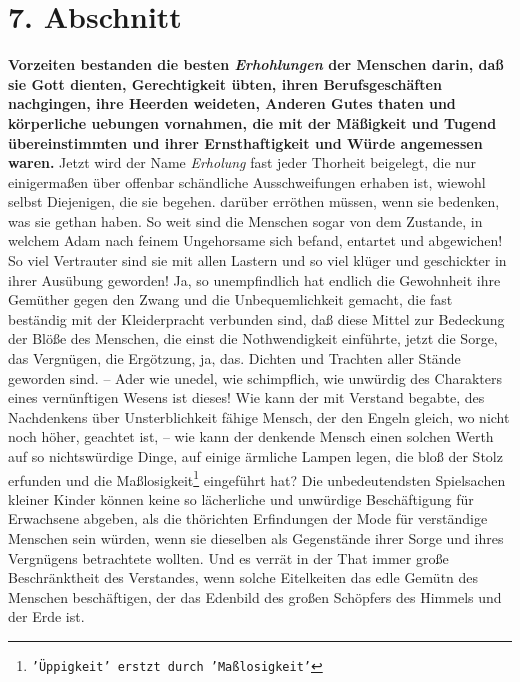 \section{7. Abschnitt} \label{kap14_ab7}

\label{ref:14_07_wahre_nachfolger_erholung}
 \textbf{Vorzeiten bestanden die besten \textit{Erhohlungen} der Menschen darin, daß sie Gott
dienten, Gerechtigkeit übten, ihren Berufsgeschäften nachgingen, ihre Heerden
weideten, Anderen Gutes thaten und körperliche uebungen vornahmen, die mit der
Mäßigkeit und Tugend übereinstimmten und ihrer Ernsthaftigkeit und Würde
angemessen waren.} Jetzt wird der Name \textit{Erholung} fast jeder Thorheit
beigelegt, die nur einigermaßen über offenbar schändliche Ausschweifungen
erhaben ist, wiewohl selbst Diejenigen, die sie begehen. darüber erröthen
müssen, wenn sie bedenken, was sie gethan haben. So weit sind die Menschen sogar
von dem Zustande, in welchem Adam nach feinem Ungehorsame sich befand, entartet
und abgewichen! So viel Vertrauter sind sie mit allen Lastern und so viel klüger
und geschickter in ihrer Ausübung geworden! Ja, so unempfindlich hat endlich die
Gewohnheit ihre Gemüther gegen den Zwang und die Unbequemlichkeit gemacht, die
fast beständig mit der Kleiderpracht verbunden sind, daß diese Mittel zur
Bedeckung der Blöße des Menschen, die einst die Nothwendigkeit einführte, jetzt
die Sorge, das Vergnügen, die Ergötzung, ja, das. Dichten und Trachten aller
Stände geworden sind. -- Ader wie unedel, wie schimpflich, wie unwürdig des
Charakters eines vernünftigen Wesens ist dieses! Wie kann der mit Verstand
begabte, des Nachdenkens über Unsterblichkeit fähige Mensch, der den Engeln
gleich, wo nicht noch höher, geachtet ist, -- wie kann der denkende Mensch einen
solchen Werth auf so nichtswürdige Dinge, auf einige ärmliche Lampen legen, die
bloß der Stolz erfunden und die Maßlosigkeit\footnote{\texttt{'Üppigkeit' erstzt durch 'Maßlosigkeit'}} eingeführt hat? Die unbedeutendsten
Spielsachen kleiner Kinder können keine so lächerliche und unwürdige
Beschäftigung für Erwachsene abgeben, als die thörichten Erfindungen der Mode
für verständige Menschen sein würden, wenn sie dieselben als Gegenstände ihrer
Sorge und ihres Vergnügens betrachtete wollten. Und es verrät in der That immer
große Beschränktheit des Verstandes, wenn solche Eitelkeiten das edle Gemütn des
Menschen beschäftigen, der das Edenbild des großen Schöpfers des Himmels und der
Erde ist.

